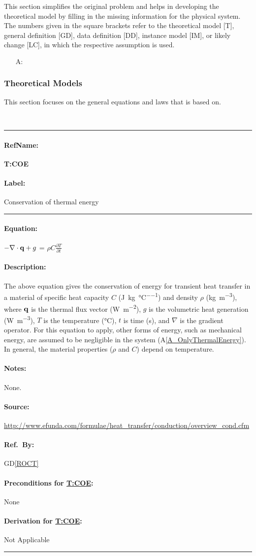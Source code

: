 \documentclass[12pt]{article}
\newcommand{\dref}[1]{GD\ref{#1}}
\newcounter{assumpnum} %
\newcommand{\aref}[1]{A\ref{#1}}
\newcommand{\deftheory}[9][Not Applicable]
{
\newpage
\noindent \rule{\textwidth}{0.5mm}

\paragraph{RefName: } \textbf{#2} \phantomsection 
\label{#2}

\paragraph{Label:} #3

\noindent \rule{\textwidth}{0.5mm}

\paragraph{Equation:}

#4

\paragraph{Description:}

#5

\paragraph{Notes:}

#6

\paragraph{Source:}

#7

\paragraph{Ref.\ By:}

#8

\paragraph{Preconditions for \hyperref[#2]{#2}:}
\label{#2_precond}

#9

\paragraph{Derivation for \hyperref[#2]{#2}:}
\label{#2_deriv}

#1

\noindent \rule{\textwidth}{0.5mm}

}
\begin{document}
This section simplifies the original problem and helps in developing the
theoretical model by filling in the missing information for the physical
system. The numbers given in the square brackets refer to the theoretical model
[T], general definition [GD], data definition [DD], instance model [IM], or
likely change [LC], in which the respective assumption is used.

\begin{itemize}

\item[A\refstepcounter{assumpnum}\theassumpnum \label{A_meaningfulLabel}:]

\end{itemize}

\subsubsection{Theoretical Models}\label{sec_theoretical}


This section focuses on the general equations and laws that \progname{} is based
on.  

~\newline

\noindent
\deftheory
{T:COE}
{Conservation of thermal energy}
{
  $-{\bf \nabla \cdot q} + g$ = $\rho C \frac{\partial T}{\partial t}$
}
{
  The above equation gives the conservation of energy for transient heat transfer in a material
  of specific heat capacity $C$ (\si{\joule\per\kilogram\per\celsius}) and density $\rho$ 
  (\si{\kilogram\per\cubic\metre}), where $\bf q$ is the thermal flux vector (\si{\watt\per\square\metre}),
  $g$ is the volumetric heat generation
  (\si{\watt\per\cubic\metre}), $T$ is the temperature
  (\si{\celsius}),  $t$ is time (\si{\second}), and $\nabla$ is
  the gradient operator.  For this equation to apply, other forms
  of energy, such as mechanical energy, are assumed to be negligible in the
  system (\aref{A_OnlyThermalEnergy}).  In general, the material properties ($\rho$ and $C$) depend on temperature.
}
{
None.
}
{
  \url{http://www.efunda.com/formulae/heat_transfer/conduction/overview_cond.cfm}
}
{
  \dref{ROCT}
}
{
None
}
{}
\end{document}

